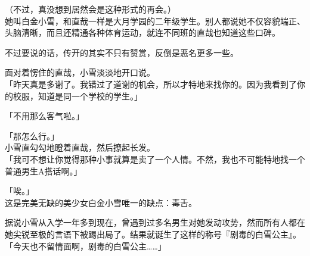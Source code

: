 （不过，真没想到居然会是这种形式的再会。）\\

她叫白金小雪，和直哉一样是大月学园的二年级学生。别人都说她不仅容貌端正、头脑清晰，而且还精通各种体育运动，就连不同班的直哉也知道这些口碑。

不过要说的话，传开的其实不只有赞赏，反倒是恶名更多一些。

面对着愣住的直哉，小雪淡淡地开口说。\\

「昨天真是多谢了。我错过了道谢的机会，所以才特地来找你的。因为我看到了你的校服，知道是同一个学校的学生。」

「不用那么客气啦。」

「那怎么行。」\\

小雪直勾勾地瞪着直哉，然后撩起长发。\\

「我可不想让你觉得那种小事就算是卖了一个人情。不然，我也不可能特地找一个普通男生A搭话啊。」

「唉。」\\

这是完美无缺的美少女白金小雪唯一的缺点：毒舌。

据说小雪从入学一年多到现在，曾遇到过多名男生对她发动攻势，然而所有人都在她尖锐至极的言语下被踢出局了。结果就诞生了这样的称号『剧毒的白雪公主』。\\

「今天也不留情面啊，剧毒的白雪公主……」

